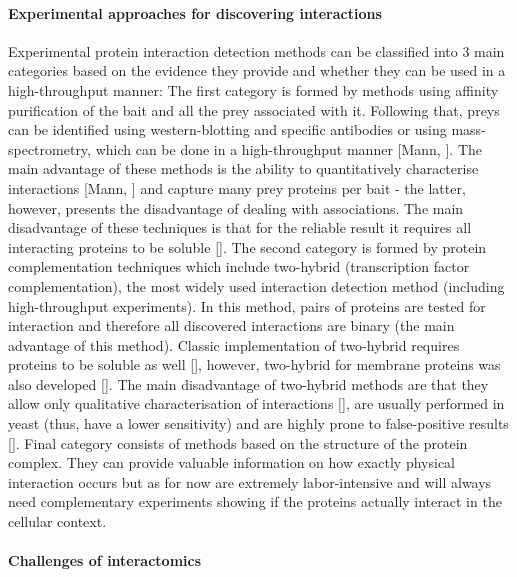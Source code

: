 \documentclass[]{article}
\let\oldparagraph\paragraph
\renewcommand{\paragraph}[1]{\oldparagraph{#1}\mbox{}}
\begin{document}
\paragraph{Experimental approaches for discovering
interactions}\label{experimental-approaches-for-discovering-interactions}

Experimental protein interaction detection methods can be classified
into 3 main categories based on the evidence they provide and whether
they can be used in a high-throughput manner: The first category is
formed by methods using affinity purification of the bait and all the
prey associated with it. Following that, preys can be identified using
western-blotting and specific antibodies or using mass-spectrometry,
which can be done in a high-throughput manner {[}Mann, {]}. The main
advantage of these methods is the ability to quantitatively characterise
interactions {[}Mann, {]} and capture many prey proteins per bait - the
latter, however, presents the disadvantage of dealing with associations.
The main disadvantage of these techniques is that for the reliable
result it requires all interacting proteins to be soluble {[}{]}. The
second category is formed by protein complementation techniques which
include two-hybrid (transcription factor complementation), the most
widely used interaction detection method (including high-throughput
experiments). In this method, pairs of proteins are tested for
interaction and therefore all discovered interactions are binary (the
main advantage of this method). Classic implementation of two-hybrid
requires proteins to be soluble as well {[}{]}, however, two-hybrid for
membrane proteins was also developed {[}{]}. The main disadvantage of
two-hybrid methods are that they allow only qualitative characterisation
of interactions {[}{]}, are usually performed in yeast (thus, have a
lower sensitivity) and are highly prone to false-positive results
{[}{]}. Final category consists of methods based on the structure of the
protein complex. They can provide valuable information on how exactly
physical interaction occurs but as for now are extremely labor-intensive
and will always need complementary experiments showing if the proteins
actually interact in the cellular context.

\paragraph{Challenges of
interactomics}\label{challenges-of-interactomics}
\end{document}
